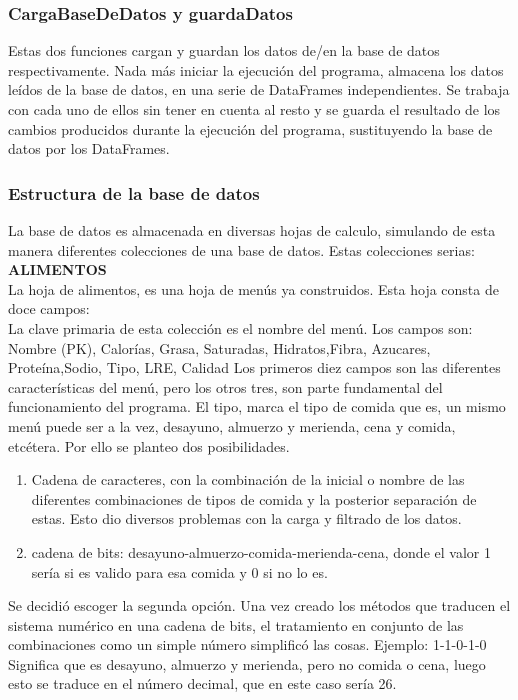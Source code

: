 \subsubsection{CargaBaseDeDatos y guardaDatos}
Estas dos funciones cargan y guardan los datos de/en la base de datos respectivamente. Nada más iniciar la ejecución del programa, almacena los datos leídos de la base de datos, en una serie de DataFrames independientes. Se trabaja con cada uno de ellos sin tener en cuenta al resto y se guarda el resultado de los cambios producidos durante la ejecución del programa, sustituyendo la base de datos por los DataFrames. \\

\subsubsection{Estructura de la base de datos}
La base de datos es almacenada en diversas hojas de calculo, simulando de esta manera diferentes colecciones de una base de datos. Estas colecciones serias:
\textbf{\textsc{ALIMENTOS}}\\
La hoja de alimentos, es una hoja de menús ya construidos. Esta hoja consta de doce campos:\\

La clave primaria de esta colección es el nombre del menú. Los campos son:
Nombre (PK), Calorías, Grasa, Saturadas, Hidratos,Fibra, Azucares, Proteína,Sodio, Tipo, LRE, Calidad
Los primeros diez campos son las diferentes características del menú, pero los otros tres, son parte fundamental del funcionamiento del programa.
El tipo, marca el tipo de comida que es, un mismo menú puede ser a la vez, desayuno, almuerzo y merienda, cena y comida, etcétera. Por ello se planteo dos posibilidades.
\begin{enumerate}
\item Cadena de caracteres, con la combinación de la inicial o nombre de las diferentes combinaciones de tipos de comida y la posterior separación de estas. Esto dio diversos problemas con la carga y filtrado de los datos.
\item cadena de bits: desayuno-almuerzo-comida-merienda-cena, donde el valor 1 sería si es valido para esa comida y 0 si no lo es.
\end{enumerate} 
Se decidió escoger la segunda opción. Una vez creado los métodos que traducen el sistema numérico en una cadena de bits, el tratamiento en conjunto de las combinaciones como un simple número simplificó las cosas. Ejemplo:
1-1-0-1-0 \\
Significa que es desayuno, almuerzo y merienda, pero no comida o cena, luego esto se traduce en el número decimal, que en este caso sería 26.\\

